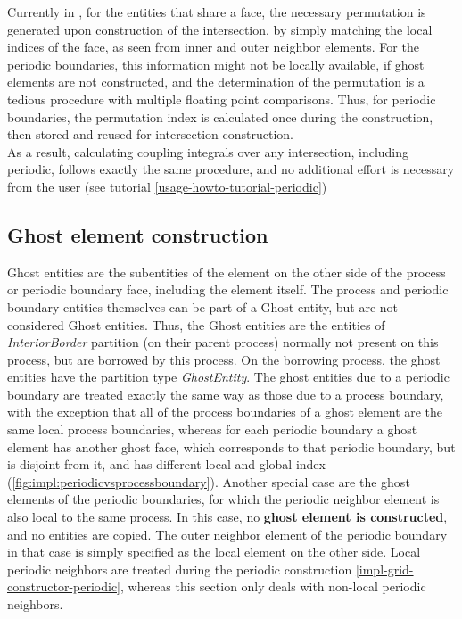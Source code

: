 \noindent
Currently in \curvgrid{}, for the entities that share a face, the necessary permutation is generated upon construction of the intersection, by simply matching the local indices of the face, as seen from inner and outer neighbor elements. For the periodic boundaries, this information might not be locally available, if ghost elements are not constructed, and the determination of the permutation is a tedious procedure with multiple floating point comparisons. Thus, for periodic boundaries, the permutation index is calculated once during the construction, then stored and reused for intersection construction. \\

\noindent
As a result, calculating coupling integrals over any intersection, including periodic, follows exactly the same procedure, and no additional effort is necessary from the user (see tutorial \cref{usage-howto-tutorial-periodic}) \\



\subsection{Ghost element construction}
\label{impl-grid-constructor-ghost}

\noindent
Ghost entities are the subentities of the element on the other side of the process or periodic boundary face, including the element itself. The process and periodic boundary entities themselves can be part of a Ghost entity, but are not considered Ghost entities. Thus, the Ghost entities are the entities of \textit{InteriorBorder} partition (on their parent process) normally not present on this process, but are borrowed by this process. On the borrowing process, the ghost entities have the partition type \textit{GhostEntity}. The ghost entities due to a periodic boundary are treated exactly the same way as those due to a process boundary, with the exception that all of the process boundaries of a ghost element are the same local process boundaries, whereas for each periodic boundary a ghost element has another ghost face, which corresponds to that periodic boundary, but is disjoint from it, and has different local and global index (\cref{fig:impl:periodicvsprocessboundary}). Another special case are the ghost elements of the periodic boundaries, for which the periodic neighbor element is also local to the same process. In this case, no \textbf{ghost element is constructed}, and no entities are copied. The outer neighbor element of the periodic boundary in that case is simply specified as the local element on the other side. Local periodic neighbors are treated during the periodic construction \cref{impl-grid-constructor-periodic}, whereas this section only deals with non-local periodic neighbors. \\

